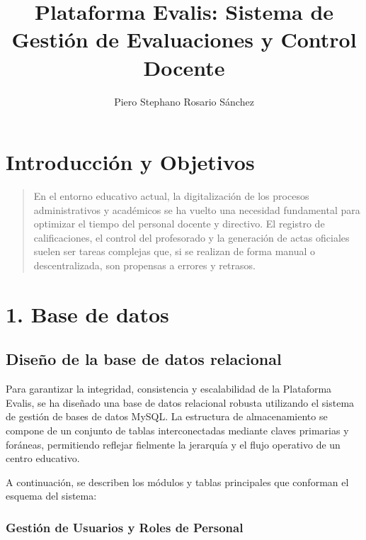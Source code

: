 \documentclass[spanish]{report}
\begin{document}
\title{Plataforma Evalis: Sistema de Gestión de Evaluaciones y Control Docente}
\author{Piero Stephano Rosario Sánchez}
\maketitle

\chapter{Introducción y Objetivos}
\begin{verse}
En el entorno educativo actual, la digitalización de los procesos
administrativos y académicos se ha vuelto una necesidad fundamental
para optimizar el tiempo del personal docente y directivo. El registro
de calificaciones, el control del profesorado y la generación de actas
oficiales suelen ser tareas complejas que, si se realizan de forma
manual o descentralizada, son propensas a errores y retrasos.
\end{verse}

\chapter{1. Base de datos}

\section{Diseño de la base de datos relacional}

Para garantizar la integridad, consistencia y escalabilidad de la
Plataforma Evalis, se ha diseñado una base de datos relacional robusta
utilizando el sistema de gestión de bases de datos MySQL. La estructura
de almacenamiento se compone de un conjunto de tablas interconectadas
mediante claves primarias y foráneas, permitiendo reflejar fielmente
la jerarquía y el flujo operativo de un centro educativo.

A continuación, se describen los módulos y tablas principales que
conforman el esquema del sistema:

\subsection{Gestión de Usuarios y Roles de Personal}
\end{document}
